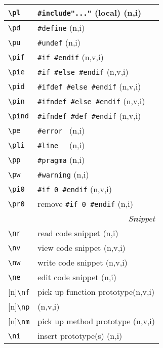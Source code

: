 \documentclass[oneside,11pt,landscape,DIV16]{scrartcl}
\newcommand{\Rep}{{\tiny{[n]}}}
\begin{document}
\begin{multicols}{3}
\begin{center}
\begin{tabular}[]{|p{11mm}|p{60mm}|}
\hline \verb'\pl'   & \verb$#include"..."$ (local) \hfill (n,i)\\
\hline \verb'\pd'   & \verb'#define'               \hfill (n,i)\\
\hline \verb'\pu'   & \verb'#undef'                \hfill (n,i)\\
\hline \verb'\pif'  & \verb'#if #endif'            \hfill (n,v,i)\\
\hline \verb'\pie'  & \verb'#if #else #endif'      \hfill (n,v,i)\\
\hline \verb'\pid'  & \verb'#ifdef #else #endif'   \hfill (n,v,i)\\
\hline \verb'\pin'  & \verb'#ifndef #else #endif'  \hfill (n,v,i)\\
\hline \verb'\pind' & \verb'#ifndef #def #endif'   \hfill (n,v,i)\\
\hline \verb'\pe'   & \verb'#error '               \hfill (n,i)\\
\hline \verb'\pli'  & \verb'#line  '               \hfill (n,i)\\
\hline \verb'\pp'   & \verb'#pragma'               \hfill (n,i)\\
\hline \verb'\pw'   & \verb'#warning'              \hfill (n,i)\\
\hline \verb'\pi0'  & \verb'#if 0 #endif'          \hfill (n,v,i)\\
\hline \verb'\pr0'  & remove \verb'#if 0 #endif'   \hfill (n,i)\\
\hline
\hline 
\multicolumn{2}{|r|}{\textsl{S\textbf{n}ippet}} \\
\hline     \verb'\nr'  & read code snippet         \hfill (n,i)\\
\hline     \verb'\nv'  & view code snippet         \hfill (n,v,i)\\
\hline     \verb'\nw'  & write code snippet        \hfill (n,v,i)\\
\hline     \verb'\ne'  & edit code snippet         \hfill (n,i)\\
\hline \Rep\verb'\nf'  & pick up function prototype\hfill (n,v,i)\\
       \Rep\verb'\np'  &                           \hfill (n,v,i)\\
\hline \Rep\verb'\nm'  & pick up method prototype  \hfill (n,v,i)\\
\hline     \verb'\ni'  & insert prototype(s)       \hfill (n,i)\\

\end{tabular}
\end{center}
\end{multicols}
\end{document}
